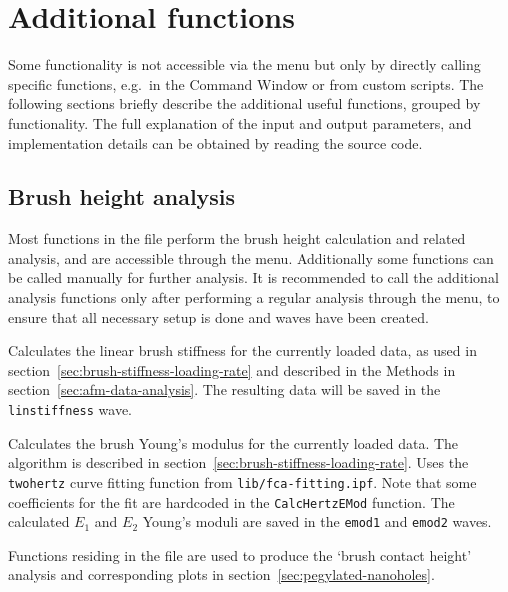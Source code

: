 \documentclass[12pt,a4paper]{article}
\begin{document}
\section{Additional functions}
\label{sec:afmsoftware-functions}
Some functionality is not accessible via the  menu but only by directly calling specific functions, e.g.\ in the Command Window or from custom scripts.
The following sections briefly describe the additional useful functions, grouped by functionality.
The full explanation of the input and output parameters, and implementation details can be obtained by reading the source code.

\subsection{Brush height analysis}
Most functions in the file  perform the brush height calculation and related analysis, and are accessible through the menu. Additionally some functions can be called manually for further analysis.
It is recommended to call the additional analysis functions only after performing a regular analysis through the menu, to ensure that all necessary setup is done and waves have been created.

\begin{description}[style=nextline]

\item[CalcLinStiffness]
Calculates the linear brush stiffness for the currently loaded data, as used in section~\ref{sec:brush-stiffness-loading-rate} and described in the Methods in section~\ref{sec:afm-data-analysis}. The resulting data will be saved in the \texttt{linstiffness} wave.

\item[CalcHertzEModAll]
Calculates the brush Young's modulus for the currently loaded data. The algorithm is described in section~\ref{sec:brush-stiffness-loading-rate}. Uses the \texttt{twohertz} curve fitting function from \texttt{lib/fca-fitting.ipf}.
Note that some coefficients for the fit are hardcoded in the \texttt{CalcHertzEMod} function. The calculated $E_1$ and $E_2$ Young's moduli are saved in the \texttt{emod1} and \texttt{emod2} waves.

\end{description}


Functions residing in the file  are used to produce the \enquote*{brush contact height} analysis and corresponding plots in section~\ref{sec:pegylated-nanoholes}.
\end{document}
